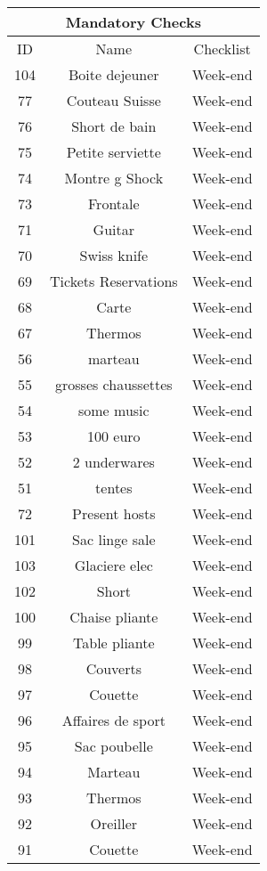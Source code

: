 \begin{longtable}{|c|c|c|}
\hline
\multicolumn{3}{|c|}{Mandatory Checks} \\
\hline
ID & Name & Checklist\\
\hline
104 & Boite dejeuner & Week-end\\
\hline
77 & Couteau Suisse & Week-end\\
\hline
76 & Short de bain & Week-end\\
\hline
75 & Petite serviette & Week-end\\
\hline
74 & Montre g Shock & Week-end\\
\hline
73 & Frontale & Week-end\\
\hline
71 & Guitar & Week-end\\
\hline
70 & Swiss knife & Week-end\\
\hline
69 & Tickets Reservations & Week-end\\
\hline
68 & Carte & Week-end\\
\hline
67 & Thermos & Week-end\\
\hline
56 & marteau & Week-end\\
\hline
55 & grosses chaussettes & Week-end\\
\hline
54 & some music & Week-end\\
\hline
53 & 100 euro & Week-end\\
\hline
52 & 2 underwares & Week-end\\
\hline
51 & tentes & Week-end\\
\hline
72 & Present hosts & Week-end\\
\hline
101 & Sac linge sale & Week-end\\
\hline
103 & Glaciere elec & Week-end\\
\hline
102 & Short & Week-end\\
\hline
100 & Chaise pliante & Week-end\\
\hline
99 & Table pliante & Week-end\\
\hline
98 & Couverts & Week-end\\
\hline
97 & Couette & Week-end\\
\hline
96 & Affaires de sport & Week-end\\
\hline
95 & Sac poubelle & Week-end\\
\hline
94 & Marteau & Week-end\\
\hline
93 & Thermos & Week-end\\
\hline
92 & Oreiller & Week-end\\
\hline
91 & Couette & Week-end\\

\end{longtable}
